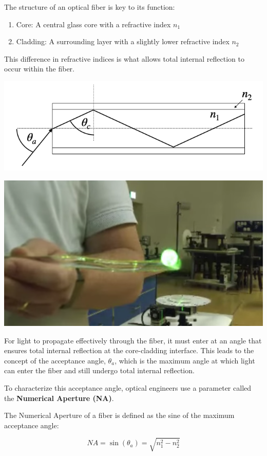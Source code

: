 \documentclass[
  a4paper,
]{book}
\providecommand{\tightlist}{%
  \setlength{\itemsep}{0pt}\setlength{\parskip}{0pt}}
\begin{document}
The structure of an optical fiber is key to its function:

\begin{enumerate}
\def\labelenumi{\arabic{enumi}.}
\tightlist
\item
  Core: A central glass core with a refractive index \(n_1\)
\item
  Cladding: A surrounding layer with a slightly lower refractive index
  \(n_2\)
\end{enumerate}

This difference in refractive indices is what allows total internal
reflection to occur within the fiber.

\includegraphics[width=0.59\linewidth,height=\textheight,keepaspectratio]{geometrical-optics/../assets/images/reflection/fiber.png}
\begin{center}
\includegraphics[width=0.4\linewidth,height=\textheight,keepaspectratio]{geometrical-optics/../assets/images/reflection/tir_rod.png}
\end{center}

For light to propagate effectively through the fiber, it must enter at
an angle that ensures total internal reflection at the core-cladding
interface. This leads to the concept of the acceptance angle,
\(\theta_a\), which is the maximum angle at which light can enter the
fiber and still undergo total internal reflection.

To characterize this acceptance angle, optical engineers use a parameter
called the \textbf{Numerical Aperture (NA)}.

\begin{tcolorbox}[enhanced jigsaw, coltitle=black, title=\textcolor{quarto-callout-tip-color}{\faLightbulb}\hspace{0.5em}{Numerical Aperture}, colframe=quarto-callout-tip-color-frame, toprule=.15mm, opacitybacktitle=0.6, left=2mm, opacityback=0, breakable, toptitle=1mm, bottomtitle=1mm, leftrule=.75mm, arc=.35mm, titlerule=0mm, colbacktitle=quarto-callout-tip-color!10!white, rightrule=.15mm, bottomrule=.15mm, colback=white]

The Numerical Aperture of a fiber is defined as the sine of the maximum
acceptance angle:

\begin{equation}
NA = \sin(\theta_a) = \sqrt{n_1^2 - n_2^2}
\end{equation}

\end{tcolorbox}
\end{document}
